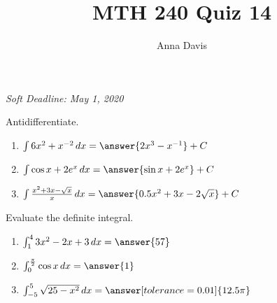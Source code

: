 \documentclass{ximera}
\author{Anna Davis} \title{MTH 240 Quiz 14}
\begin{document}
\begin{abstract}

\end{abstract}
\maketitle
 \textit{Soft Deadline: May 1, 2020}
\begin{problem}\label{prob:240quiz14prob1}
Antidifferentiate.
\begin{enumerate}
\item
$\int 6x^2+x^{-2}\,dx=\answer{2x^3-x^{-1}}+C$

\item
$\int \cos x+2e^x\, dx=\answer{\sin x +2e^x}+C$

\item
$\int \frac{x^2+3x-\sqrt{x}}{x}\,dx=\answer{0.5x^2+3x-2\sqrt{x}}+C$

  \end{enumerate}
\end{problem}

\begin{problem}\label{prob:240quiz14prob2}
Evaluate the definite integral.

\begin{enumerate}
    \item $\int_1^4 3x^2-2x+3\,dx=\answer{57}$
    \item $\int_0^{\frac{\pi}{2}} \cos x\,dx=\answer{1}$
    \item $\int_{-5}^5 \sqrt{25-x^2}\,dx=\answer[tolerance=0.01]{12.5\pi}$
\end{enumerate}
\end{problem}
\end{document}
